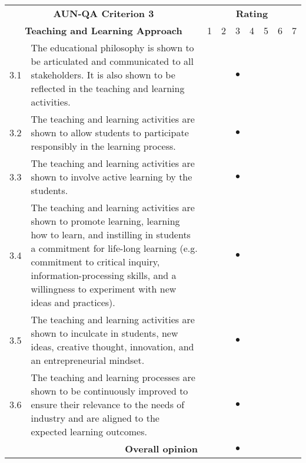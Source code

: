 \begin{longtable}{|c| p{}|p{0.3cm}|p{0.3cm}|c|p{0.3cm}|p{0.3cm}|p{0.3cm}|p{0.3cm}|}
	\hline
	\multicolumn{2}{|c|}{\bf AUN-QA Criterion 3}&\multicolumn{7}{c|}{\bf Rating}\\\cline{3-9}
	\multicolumn{2}{|c|}{\bf Teaching and Learning Approach}&1&2&3&4&5&6&7\\\hline
	\endhead

3.1&The educational philosophy is shown to be articulated and communicated to all stakeholders. It is also shown to be reflected in the teaching and learning activities. &&& {\huge{$\bullet$}}&&&&\\\hline 

3.2&The teaching and learning activities are shown to allow students to participate responsibly in the learning process. &&& {\huge{$\bullet$}}&&&&\\\hline

3.3&The teaching and learning activities are shown to involve active learning by the students.&&& {\huge{$\bullet$}}&&&&\\\hline

3.4&The teaching and learning activities are shown to promote learning, learning how to learn, and instilling in students a commitment for life-long learning (e.g. commitment to critical inquiry, information-processing skills, and a willingness to experiment with new ideas and practices). &&& {\huge{$\bullet$}}&&&&\\\hline

3.5&The teaching and learning activities are shown to inculcate in students, new ideas, creative thought, innovation, and an entrepreneurial mindset.&&& {\huge{$\bullet$}}&&&&\\\hline

3.6& The teaching and learning processes are shown to be continuously improved to ensure their relevance to the needs of industry and are aligned to the expected learning outcomes.&&& {\huge{$\bullet$}}&&&&\\\hline
	

\multicolumn{2}{|r|}{\bf Overall opinion}&&& {\huge{$\bullet$}}&&&&\\\hline

\end{longtable}



